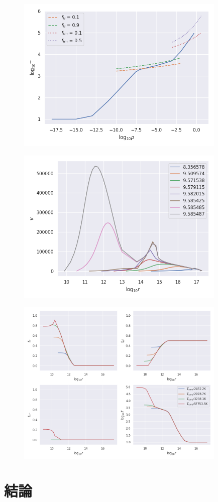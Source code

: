 \documentclass[a4j, dvipdfmx]{jsarticle}
\begin{document}
\begin{figure}[H]
    \includegraphics[clip,width=10.0cm]{graph/core.png}
    \caption{}
    \label{fig:core2nd}
\end{figure}
\begin{figure}[H]
    \includegraphics[clip,width=10.0cm]{graph/v_r.png}
    \caption{}
    \label{fig:v_r}
\end{figure}
\begin{figure}[H]
    \includegraphics[clip,width=10.0cm]{graph/f_r.png}
    \caption{}
    \label{fig:f_r}
\end{figure}


\section{結論}


\end{document}
